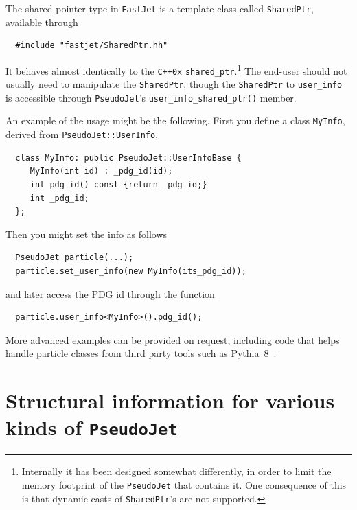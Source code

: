 \documentclass[12pt,a4]{article}
\newcommand{\fastjet}{\texttt{FastJet}\xspace}
\newcommand{\ttt}[1]{{\small\texttt{#1}}}
\newcommand{\PJ}{\ttt{PseudoJet}\xspace}
\begin{document}
The shared pointer type in \fastjet is a template class called
\ttt{SharedPtr}, available through 
%
\begin{lstlisting}
  #include "fastjet/SharedPtr.hh"
\end{lstlisting}
%
It behaves almost identically to the \ttt{C++0x} \ttt{shared\_ptr}.\footnote{
%
Internally it has been designed somewhat differently, in order
to limit the memory footprint of the \PJ that contains it. One
consequence of this is that dynamic casts of \ttt{SharedPtr}'s are not
supported.}
%
The end-user should not usually need to manipulate the
\ttt{SharedPtr}, though the \ttt{SharedPtr} to \ttt{user\_info} is
accessible through \PJ's \ttt{user\_info\_shared\_ptr()} member.

An example of the usage might be the following. First you define a
class \ttt{MyInfo}, derived from \ttt{PseudoJet::UserInfo},
\begin{lstlisting}
  class MyInfo: public PseudoJet::UserInfoBase {
     MyInfo(int id) : _pdg_id(id);
     int pdg_id() const {return _pdg_id;}
     int _pdg_id;
  };
\end{lstlisting}
Then you might set the info as follows
\begin{lstlisting}
  PseudoJet particle(...);
  particle.set_user_info(new MyInfo(its_pdg_id));
\end{lstlisting}
and later access the PDG id through the function
\begin{lstlisting}
  particle.user_info<MyInfo>().pdg_id();
\end{lstlisting}
More advanced examples can be provided on request, including code that
helps handle particle classes from third party tools such as
Pythia~8~\cite{Sjostrand:2007gs}.

\section{Structural information for various kinds of \texttt{PseudoJet}}
\label{app:structure_table}
\end{document}
